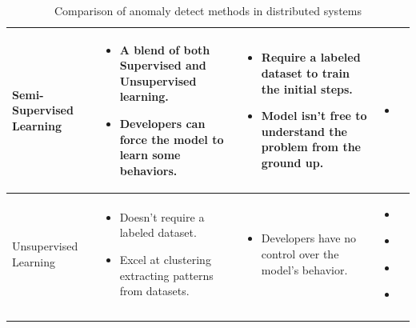 \begin{longtable}{| p{23mm} | p{42mm} | p{42mm} | p{42mm} |}
    Semi-Supervised Learning &
    \vspace{-8mm}
    \begin{itemize}[leftmargin=0mm,noitemsep,nolistsep,label={}] 
        \item A blend of both Supervised and Unsupervised learning.
        \item Developers can force the model to learn some behaviors.
        \vspace{-7mm}
    \end{itemize} &
    \vspace{-8mm}
    \begin{itemize}[leftmargin=0mm,noitemsep,nolistsep,label={}] 
        \item Require a labeled dataset to train the initial steps.
        \item Model isn’t free to understand the problem from the ground up.
        \vspace{-7mm}
    \end{itemize} &
    \vspace{-8mm}
    \begin{itemize}[leftmargin=0mm,noitemsep,nolistsep,label={}] 
        \item \cite{akcay2018ganomaly}
        \vspace{-7mm}
    \end{itemize} \\ \hline
    
    Unsupervised Learning &
    \vspace{-8mm}
    \begin{itemize}[leftmargin=0mm,noitemsep,nolistsep,label={}] 
        \item Doesn’t require a labeled dataset.
        \item Excel at clustering extracting patterns from datasets.
        \vspace{-7mm}
    \end{itemize} &
    \vspace{-8mm}
    \begin{itemize}[leftmargin=0mm,noitemsep,nolistsep,label={}] 
        \item Developers have no control over the model’s behavior.
        \vspace{-7mm}
    \end{itemize} &
    \vspace{-8mm}
    \begin{itemize}[leftmargin=0mm,noitemsep,nolistsep,label={}] 
        \item \cite{kumarage2018anomaly}
        \item \cite{zhang2019deep}
        \item \cite{kumarage2019generative}
        \item \cite{khoshnevisan2019rsm}
        \vspace{-7mm}
    \end{itemize} \\ \hline
    \caption{Comparison of anomaly detect methods in distributed systems}
\end{longtable}

